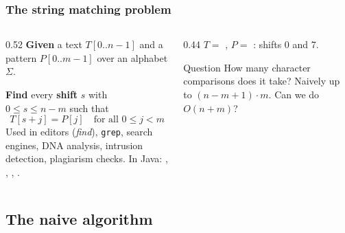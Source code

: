 \documentclass[aspectratio=169,10pt,compress]{beamer}
\begin{document}
\begin{frame}[t,fragile] \frametitle{The string matching problem}
  \begin{columns}[T]
    \begin{column}{0.52\textwidth}
      \textbf{Given} a text $T[0..n-1]$ and a pattern $P[0..m-1]$ over an alphabet $\Sigma$.

      \textbf{Find} every \textbf{shift} $s$ with $0 \le s \le n - m$ such that
      \[
      	T[s + j] = P[j] \quad \text{for all } 0 \le j < m
      \]
      \small Used in editors (\emph{find}), \texttt{grep}, search engines, DNA analysis, intrusion detection, plagiarism checks.
      In Java: , , , .
    \end{column}
    \begin{column}{0.44\textwidth}
      \small $T = $ , $P = $ : shifts 0 and 7.
      \begin{center}
      \end{center}
      
      \begin{alertblock}{Question}
        \small 
        How many character comparisons does it take? 
        Naively up to $(n - m + 1) \cdot m$.
        Can we do $O(n + m)$?
      \end{alertblock}
      
    \end{column}
  \end{columns}
\end{frame}

\subsection[Naive]{The naive algorithm}
\end{document}
